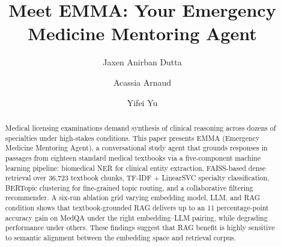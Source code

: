 \documentclass[sigplan,screen]{acmart}
\begin{document}
\title{Meet EMMA: Your Emergency Medicine Mentoring Agent}

\author{Jaxen Anirban Dutta}

\author{Acassia Arnaud}

\author{Yifei Yu}

\renewcommand{\shortauthors}{Dutta}

\begin{abstract}
Medical licensing examinations demand synthesis of clinical reasoning across dozens
of specialties under high-stakes conditions. This paper presents EMMA (Emergency
Medicine Mentoring Agent), a conversational study agent that grounds responses in
passages from eighteen standard medical textbooks via a five-component machine
learning pipeline: biomedical NER for clinical entity extraction, FAISS-based dense
retrieval over 36,723 textbook chunks, TF-IDF + LinearSVC specialty classification,
BERTopic clustering for fine-grained topic routing, and a collaborative filtering
recommender. A six-run ablation grid varying embedding model, LLM, and RAG
condition shows that textbook-grounded RAG delivers up to an 11 percentage-point
accuracy gain on MedQA under the right embedding--LLM pairing, while degrading
performance under others. These findings suggest that RAG benefit is highly
sensitive to semantic alignment between the embedding space and retrieval corpus.
\end{abstract}
\end{document}
